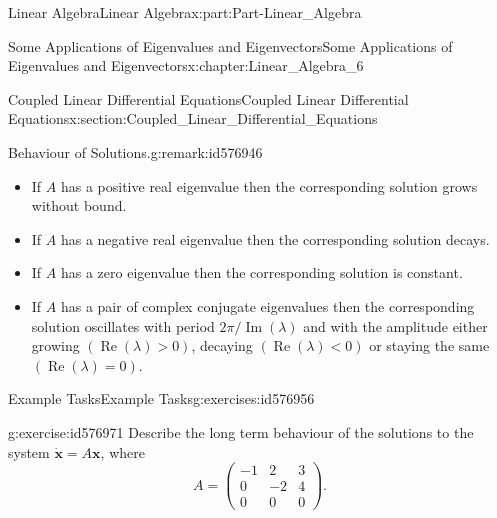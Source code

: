 \documentclass[oneside,10pt,]{book}
\numberwithin{equation}{section}
\newcommand{\bm}[1]{\boldsymbol{#1}}
\newcommand{\amp}{&}
\begin{document}
\begin{partptx}{Linear Algebra}{}{Linear Algebra}{}{}{x:part:Part-Linear_Algebra}
\begin{chapterptx}{Some Applications of Eigenvalues and Eigenvectors}{}{Some Applications of Eigenvalues and Eigenvectors}{}{}{x:chapter:Linear_Algebra_6}
\begin{sectionptx}{Coupled Linear Differential Equations}{}{Coupled Linear Differential Equations}{}{}{x:section:Coupled_Linear_Differential_Equations}
\begin{remark}{Behaviour of Solutions.}{g:remark:id576946}
%
\begin{itemize}[label=\textbullet]
\item{}If \(A\) has a positive  real eigenvalue then the corresponding solution grows without bound.%
\item{}If \(A\) has a negative  real eigenvalue then the corresponding solution decays.%
\item{}If \(A\) has a zero eigenvalue then the corresponding solution is constant.%
\item{}If \(A\) has a pair of complex conjugate eigenvalues then the corresponding solution oscillates with period \(2\pi / \operatorname{Im}(\lambda)\) and with the amplitude either growing \((\operatorname{Re}(\lambda) > 0)\), decaying \((\operatorname{Re}(\lambda) < 0 )\) or staying the same \((\operatorname{Re}(\lambda) = 0)\).%
\end{itemize}
%
\end{remark}
%
%
\typeout{************************************************}
\typeout{************************************************}
%
\begin{exercises-subsection-numberless}{Example Tasks}{}{Example Tasks}{}{}{g:exercises:id576956}
\begin{divisionexercise}{1}{}{}{g:exercise:id576971}%
Describe the long term behaviour of the solutions to the system \(\dot{\bm{x}} = A \bm{x}\), where%
\begin{equation*}
A = \begin{pmatrix} -1 \amp 2 \amp 3 \\ 0 \amp -2 \amp 4 \\ 0 \amp 0 \amp 0 \end{pmatrix}\text{.}
\end{equation*}
%
\end{divisionexercise}%
\end{exercises-subsection-numberless}
\end{sectionptx}
\end{chapterptx}
\end{partptx}
\end{document}

